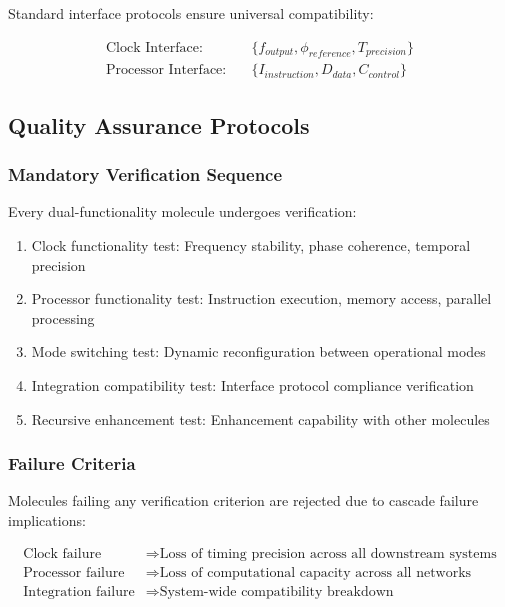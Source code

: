 Standard interface protocols ensure universal compatibility:

\begin{align}
\text{Clock Interface}: &\quad \{f_{output}, \phi_{reference}, T_{precision}\} \\
\text{Processor Interface}: &\quad \{I_{instruction}, D_{data}, C_{control}\}
\end{align}

\subsection{Quality Assurance Protocols}

\subsubsection{Mandatory Verification Sequence}

Every dual-functionality molecule undergoes verification:

\begin{enumerate}
\item Clock functionality test: Frequency stability, phase coherence, temporal precision
\item Processor functionality test: Instruction execution, memory access, parallel processing
\item Mode switching test: Dynamic reconfiguration between operational modes
\item Integration compatibility test: Interface protocol compliance verification
\item Recursive enhancement test: Enhancement capability with other molecules
\end{enumerate}

\subsubsection{Failure Criteria}

Molecules failing any verification criterion are rejected due to cascade failure implications:

\begin{align}
\text{Clock failure} &\Rightarrow \text{Loss of timing precision across all downstream systems} \\
\text{Processor failure} &\Rightarrow \text{Loss of computational capacity across all networks} \\
\text{Integration failure} &\Rightarrow \text{System-wide compatibility breakdown}
\end{align}


